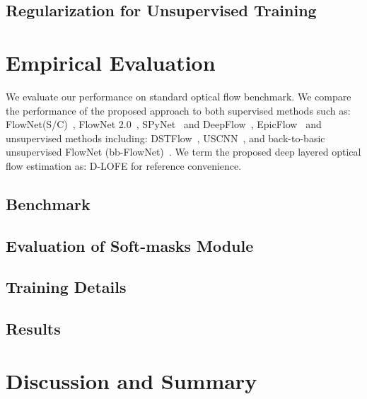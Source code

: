 \documentclass[10pt,twocolumn,letterpaper]{article}
\begin{document}
\subsection{Regularization for Unsupervised Training}


\section{Empirical Evaluation}
\label{sec: evaluation}
We evaluate our performance on standard optical flow benchmark. We compare the performance of the proposed approach to both supervised methods such as: FlowNet(S/C)~\cite{7410673}, FlowNet 2.0~\cite{Ilg_2017_CVPR}, SPyNet~\cite{Ranjan_2017_CVPR} and DeepFlow~\cite{weinzaepfel2013deepflow}, EpicFlow~\cite{revaud2015epicflow} and unsupervised methods including: DSTFlow~\cite{ren2017unsupervised}, USCNN~\cite{ahmadi2016unsupervised}, and back-to-basic unsupervised FlowNet (bb-FlowNet)~\cite{DBLP:journals/corr/YuHD16}. We term the proposed deep layered optical flow estimation as: D-LOFE for reference convenience.



\subsection{Benchmark}

\subsection{Evaluation of Soft-masks Module}

\subsection{Training Details}

\subsection{Results}

\section{Discussion and Summary}

{\small


}
\end{document}

